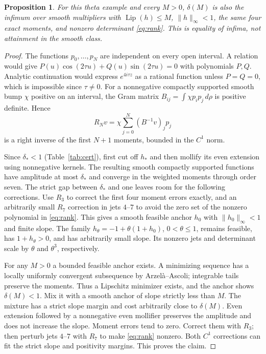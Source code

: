 \documentclass[11pt,a4paper]{article}
\numberwithin{equation}{section}
\newtheorem{proposition}[theorem]{Proposition}
\theoremstyle{remark}\newtheorem{remark}[theorem]{Remark}
\DeclareMathOperator{\Lip}{Lip}
\newcommand{\ds}{\delta_*}
\newcommand{\norm}[1]{\lVert#1\rVert}
\begin{document}
\begin{proposition}\label{prop:smooth}
For this theta example and every $M>0$, $\delta(M)$ is also the infimum
over smooth multipliers with $\Lip(h)\le M$, $\norm h_\infty<1$,
the same four exact moments, and nonzero determinant \eqref{eq:rank}.
This is equality of infima, not attainment in the smooth class.
\end{proposition}
\begin{proof}
The functions $p_0,\ldots,p_N$ are independent on every open interval.
A relation would give $P(u)\cos(2\tau u)+Q(u)\sin(2\tau u)=0$ with
polynomials $P,Q$. Analytic continuation would express $e^{4i\tau z}$
as a rational function unless $P=Q=0$, which is impossible since
$\tau\ne0$. For a nonnegative compactly supported smooth bump $\chi$
positive on an interval, the Gram matrix $B_{ij}=\int\chi p_ip_j\,d\rho$
is positive definite. Hence
\begin{equation}
 R_Nv=\chi\sum_{j=0}^N(B^{-1}v)_jp_j\label{eq:rightinverse}
\end{equation}
is a right inverse of the first $N+1$ moments, bounded in the $C^1$ norm.

Since $\ds<1$ (Table~\ref{tab:cert}), first cut off $h_*$ and then
mollify its even extension using nonnegative kernels. The resulting
smooth compactly supported functions have amplitude at most $\ds$ and
converge in the weighted moments through order seven. The strict gap
between $\ds$ and one leaves room for the following corrections.
Use $R_3$ to correct the first four moment errors exactly, and an
arbitrarily small $R_7$ correction in jets $4$--$7$ to avoid the zero set
of the nonzero polynomial in \eqref{eq:rank}. This gives a smooth
feasible anchor $h_0$ with $\norm{h_0}_\infty<1$ and finite slope.
The family $h_\theta=-1+\theta(1+h_0)$, $0<\theta\le1$, remains feasible,
has $1+h_\theta>0$, and has arbitrarily small slope. Its nonzero jets and
determinant scale by $\theta$ and $\theta^3$, respectively.

For any $M>0$ a bounded feasible anchor exists. A minimizing sequence
has a locally uniformly convergent subsequence by Arzel\`a--Ascoli;
integrable tails preserve the moments. Thus a Lipschitz minimizer exists,
and the anchor shows $\delta(M)<1$. Mix it with a smooth anchor of slope
strictly less than $M$. The mixture has a strict slope margin and cost
arbitrarily close to $\delta(M)$. Even extension followed by a nonnegative
even mollifier preserves the amplitude and does not increase the slope.
Moment errors tend to zero. Correct them with $R_3$; then perturb jets
$4$--$7$ with $R_7$ to make \eqref{eq:rank} nonzero. Both $C^1$ corrections
can fit the strict slope and positivity margins. This proves the claim.
\end{proof}
\end{document}
